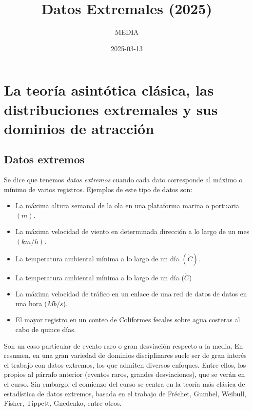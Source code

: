 \documentclass[
  20pt,
]{book}
\title{Datos Extremales (2025)}
\author{MEDIA}
\date{2025-03-13}
\providecommand{\tightlist}{%
  \setlength{\itemsep}{0pt}\setlength{\parskip}{0pt}}
\theoremstyle{definition}
\theoremstyle{definition}
\theoremstyle{definition}
\theoremstyle{definition}
\theoremstyle{remark}
\begin{document}
\maketitle

{
\setcounter{tocdepth}{1}
\tableofcontents
}
\chapter{La teoría asintótica clásica, las distribuciones extremales y sus dominios de atracción}\label{la-teoruxeda-asintuxf3tica-cluxe1sica-las-distribuciones-extremales-y-sus-dominios-de-atracciuxf3n}

\section{Datos extremos}\label{datos-extremos}

Se dice que tenemos \emph{datos extremos} cuando cada
dato corresponde al máximo o mínimo de varios
registros. Ejemplos de este tipo de datos son:

\begin{itemize}
\tightlist
\item
  La máxima altura semanal de la ola en una
  plataforma marina o portuaria \((m)\).
\item
  La máxima velocidad de viento en determinada
  dirección a lo largo de un mes \((km/h)\).
\item
  La temperatura ambiental mínima a lo largo de
  un día \((\dot{C})\).
\item
  La temperatura ambiental mínima a lo largo de
  un día (\(\dot{C}\))
\item
  La máxima velocidad de tráfico en un enlace de
  una red de datos de datos en una hora (\(Mb/s\)).
\item
  El mayor registro en un conteo de Coliformes
  fecales sobre agua costeras al cabo de quince días.
\end{itemize}

Son un caso particular de evento raro o gran
desviación respecto a la media.
En resumen, en una gran variedad de dominios
disciplinares suele ser de gran interés el trabajo
con datos extremos, los que admiten diversos
enfoques. Entre ellos, los propios al párrafo
anterior (eventos raros, grandes desviaciones), que
se verán en el curso.
Sin embargo, el comienzo del curso se centra en la
teoría más clásica de estadística de datos extremos,
basada en el trabajo de Fréchet, Gumbel, Weibull,
Fisher, Tippett, Gnedenko, entre otros.
\end{document}
